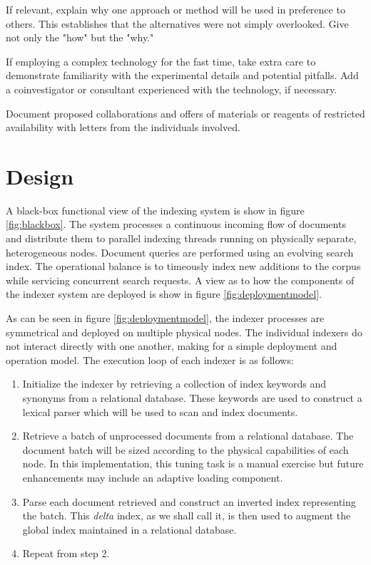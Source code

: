 \documentclass[10pt]{report}
\begin{document}
    If relevant, explain why one approach or method will be used in preference to others. This establishes that the alternatives were not simply overlooked. Give not only the "how" but the "why."

    If employing a complex technology for the fast time, take extra care to demonstrate familiarity with the experimental details and potential pitfalls. Add a coinvestigator or consultant experienced with the technology, if necessary.

    Document proposed collaborations and offers of materials or reagents of restricted availability with letters from the individuals involved.



\section{Design}
\label{sec:design}
A black-box functional view of the indexing system is show in figure
\ref{fig:blackbox}. The system processes a continuous incoming flow of
documents and distribute them to parallel indexing threads running on
physically separate, heterogeneous nodes.  Document queries are performed
using an evolving search index. The operational balance is to
timeously index new additions to the corpus while servicing concurrent
search requests. A view as to how the components of the indexer system
are deployed is show in figure \ref{fig:deploymentmodel}.

As can be seen in figure \ref{fig:deploymentmodel}, the indexer
processes are symmetrical and deployed on multiple physical nodes. The
individual indexers do not interact directly with one another, making
for a simple deployment and operation model. The execution loop of
each indexer is as follows:

\begin{enumerate}
\item Initialize the indexer by retrieving a collection of index
  keywords and synonyms from a relational database. These keywords are
  used to construct a lexical parser which will be used to scan and
  index documents.
\item Retrieve a batch of unprocessed documents from a relational
  database. The document batch will be sized according to the physical
  capabilities of each node. In this implementation, this tuning task
  is a manual exercise but future enhancements may include an adaptive
  loading component.
\item Parse each document retrieved and construct an inverted index
  representing the batch. This \textit{delta} index, as we shall call
  it, is then used to augment the global index maintained in a
  relational database.
\item Repeat from step 2.
\end{enumerate}
\end{document}
